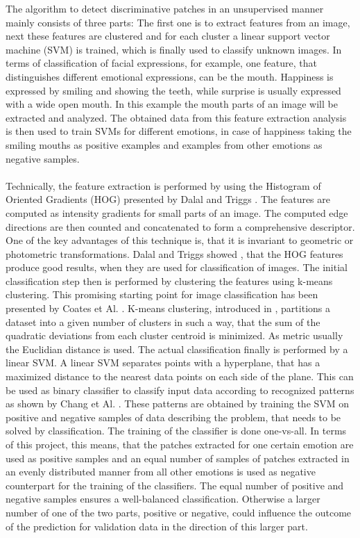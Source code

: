 The algorithm to detect discriminative patches in an unsupervised manner mainly consists of three parts: The first one is to extract features from an image, next these features are clustered and for each cluster a linear support vector machine (SVM) is trained, which is finally used to classify unknown images. In terms of classification of facial expressions, for example, one feature, that distinguishes different emotional expressions, can be the mouth. Happiness is expressed by smiling and showing the teeth, while surprise is usually expressed with a wide open mouth. In this example the mouth parts of an image will be extracted and analyzed. The obtained data from this feature extraction analysis is then used to train SVMs for different emotions, in case of happiness taking the smiling mouths as positive examples and examples from other emotions as negative samples.
\\
\\
Technically, the feature extraction is performed by using the Histogram of Oriented Gradients (HOG) presented by Dalal and Triggs \cite{Dalal:2005:HOG:1068507.1069007}. The features are computed as intensity gradients for small parts of an image. The computed edge directions are then counted and concatenated to form a comprehensive descriptor. One of the key advantages of this technique is, that it is invariant to geometric or photometric transformations. Dalal and Triggs showed \cite{Dalal:2005:HOG:1068507.1069007}, that the HOG features produce good results, when they are used for classification of images. The initial classification step then is performed by clustering the features using k-means clustering. This promising starting point for image classification has been presented by Coates et Al. \cite{DBLP:series/lncs/CoatesN12}. K-means clustering, introduced in \cite{macqueen1967}, partitions a dataset into a given number of clusters in such a way, that the sum of the quadratic deviations from each cluster centroid is minimized. As metric usually the Euclidian distance is used. The actual classification finally is performed by a linear SVM. A linear SVM separates points with a hyperplane, that has a maximized distance to the nearest data points on each side of the plane. This can be used as binary classifier to classify input data according to recognized patterns as shown by Chang et Al. \cite{Chang:2011:LLS:1961189.1961199}. These patterns are obtained by training the SVM on positive and negative samples of data describing the problem, that needs to be solved by classification. The training of the classifier is done one-vs-all. In terms of this project, this means, that the patches extracted for one certain emotion are used as positive samples and an equal number of samples of patches extracted in an evenly distributed manner from all other emotions is used as negative counterpart for the training of the classifiers. The equal number of positive and negative samples ensures a well-balanced classification. Otherwise a larger number of one of the two parts, positive or negative, could influence the outcome of the prediction for validation data in the direction of this larger part.

